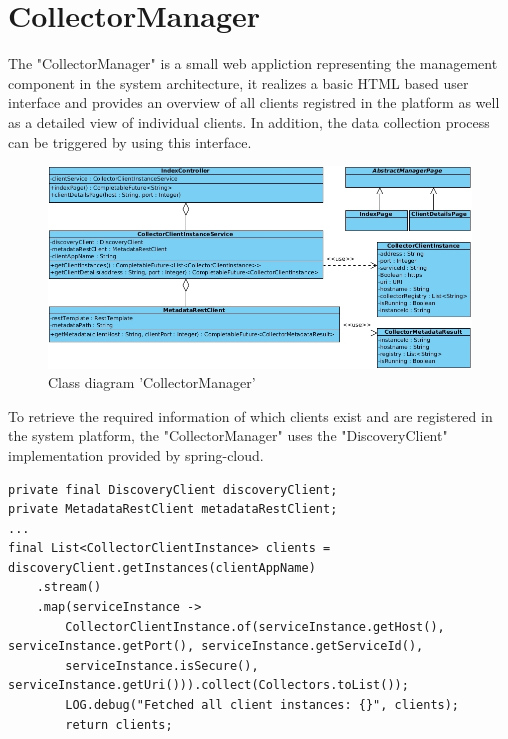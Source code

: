 \section{CollectorManager}

The "CollectorManager" is a small web appliction representing the management component in the system architecture, it
realizes a basic HTML based user interface and provides an overview of all clients registred in the platform as well as a
detailed view of individual clients. In addition, the data collection process can be triggered by using this interface.

\begin{figure}[H]
	\centering
	\includegraphics[width=1.0\textwidth]{../uml/class-collector-manager.jpg}
	\caption{Class diagram 'CollectorManager'}
	\label{class-diagram-collector-manager}
\end{figure}

To retrieve the required information of which clients exist and are registered in the system platform, the "CollectorManager"
uses the "DiscoveryClient" implementation provided by spring-cloud.

\begin{lstlisting}[caption={"CollectorClientInstanceService", Get client instances}, captionpos=b, label={lst:client-instance-service}]
private final DiscoveryClient discoveryClient;
private MetadataRestClient metadataRestClient;
...
final List<CollectorClientInstance> clients = discoveryClient.getInstances(clientAppName)
    .stream()
    .map(serviceInstance ->
        CollectorClientInstance.of(serviceInstance.getHost(), serviceInstance.getPort(), serviceInstance.getServiceId(),
        serviceInstance.isSecure(), serviceInstance.getUri())).collect(Collectors.toList());
        LOG.debug("Fetched all client instances: {}", clients);
        return clients;
\end{lstlisting}

